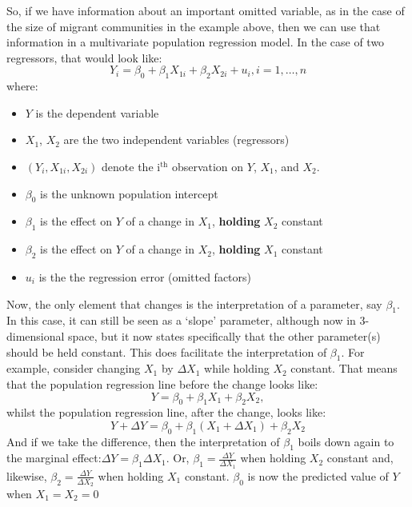 \documentclass[
]{book}
\providecommand{\tightlist}{%
  \setlength{\itemsep}{0pt}\setlength{\parskip}{0pt}}
\begin{document}
So, if we have information about an important omitted variable, as in the case of the size of migrant communities in the example above, then we can use that information in a multivariate population regression model. In the case of two regressors, that would look like:
\begin{equation}
Y_i =\beta_0 + \beta_1 X_{1i} + \beta_2 X_{2i} + u_i, i=1,\ldots,n
\end{equation}
where:

\begin{itemize}
\tightlist
\item
  \(Y\) is the dependent variable
\item
  \(X_1\), \(X_2\) are the two independent variables (regressors)
\item
  \((Y_i, X_{1i}, X_{2i})\) denote the i\(^{\mathrm{th}}\) observation on \(Y\), \(X_1\), and \(X_2\).
\item
  \(\beta_0\) is the unknown population intercept
\item
  \(\beta_1\) is the effect on \(Y\) of a change in \(X_1\), \textbf{holding} \(X_2\) constant
\item
  \(\beta_2\) is the effect on \(Y\) of a change in \(X_2\), \textbf{holding} \(X_1\) constant
\item
  \(u_i\) is the the regression error (omitted factors)
\end{itemize}

Now, the only element that changes is the interpretation of a parameter, say \(\beta_1\). In this case, it can still be seen as a `slope' parameter, although now in 3-dimensional space, but it now states specifically that the other parameter(s) should be held constant. This does facilitate the interpretation of \(\beta_1\). For example, consider changing \(X_1\) by \(\Delta X_1\) while holding \(X_2\) constant. That means that the population regression line before the change looks like:
\begin{equation}
Y = \beta_0 + \beta_1 X_{1} + \beta_2 X_{2},
\end{equation}
whilst the population regression line, after the change, looks like:
\begin{equation}
Y + \Delta Y = \beta_0 + \beta_1 (X_{1} + \Delta X_1) + \beta_2 X_{2}
\end{equation}
And if we take the difference, then the interpretation of \(\beta_1\) boils down again to the marginal effect:\(\Delta Y = \beta_1 \Delta X_1\). Or, \(\beta_1 = \frac{\Delta Y}{\Delta X_1}\) when holding \(X_2\) constant and, likewise, \(\beta_2 = \frac{\Delta Y}{\Delta X_2}\) when holding \(X_1\) constant. \(\beta_0\) is now the predicted value of \(Y\) when \(X_1 = X_2 = 0\)
\end{document}

